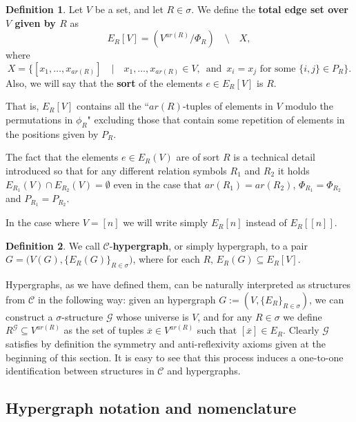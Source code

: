 \documentclass[12pt,notitlepage,a4paper]{article}
\theoremstyle{definition}
\newtheorem{definition}{Definition}[section]
\begin{document}
\begin{definition} 
	Let $V$ be a set, and let $R\in \sigma$.
	We define the \textbf{total edge set over $V$
	given by $R$} as
	\[ E_R[V]= (V^{ar(R)}/\Phi_R) \quad \setminus 
	\quad X, \]
	where
	\[
	X=
	\Big\{ [x_1,\dots,x_{ar(R)}]  
	\quad \Big| \quad
	x_1,\dots,x_{ar(R)}\in V, \,
	\text{ and } 
	 \, x_i=x_j \text{ for some } 
	\{i,j\}\in P_R \Big\}.
	\]
	Also, we will say that the \textbf{sort} of the elements $e\in E_R[V]$
	is $R$. 
\end{definition}

That is, $E_R[V]$ contains all the ``$ar(R)$-tuples of elements
in $V$ modulo the permutations
in $\phi_R$" 
excluding those that contain some repetition of elements in
the positions given by $P_R$.\par
The fact that the elements $e\in E_R(V)$ are of sort $R$ 
is a technical detail
introduced so that for any different relation symbols $R_1$ and
$R_2$ it holds $E_{R_1}(V)\cap E_{R_2}(V)=\emptyset$ even in the case
that $ar(R_1)=ar(R_2)$, $\Phi_{R_1}=\Phi_{R_2}$ and $P_{R_1}=P_{R_2}$.\par

In the case where $V=[n]$ we will write simply $E_R[n]$ instead
of $E_R[[n]]$.

\begin{definition} 
We call $\mathcal{C}$-\textbf{hypergraph}, or simply hypergraph, 
to a pair $G=\Big(V(G),\{E_R(G)\}_{R\in\sigma}\Big)$,
where for each $R$, $E_R(G) \subseteq E_R[V]$.
\end{definition}

Hypergraphs, as we have defined them, 
can be naturally interpreted as
structures from $\mathcal{C}$ 
in the following way: 
given an hypergraph $G:=(V,\{E_R\}_{R\in \sigma})$,
we can construct a $\sigma$-structure $\mathcal{G}$ whose universe is
$V$, and for any $R\in \sigma$ we define
$R^\mathcal{G}\subseteq V^{ar(R)}$ as the set of tuples
$\overline{x}\in V^{ar(R)}$ such that
$[\overline{x}]\in E_R$. Clearly $\mathcal{G}$
satisfies by definition the 
symmetry and anti-reflexivity
axioms given at the beginning of this section. It is easy to
see that this process induces
a one-to-one identification between 
structures in $\mathcal{C}$ and hypergraphs. \par

\subsection{Hypergraph notation and nomenclature}
\end{document}
